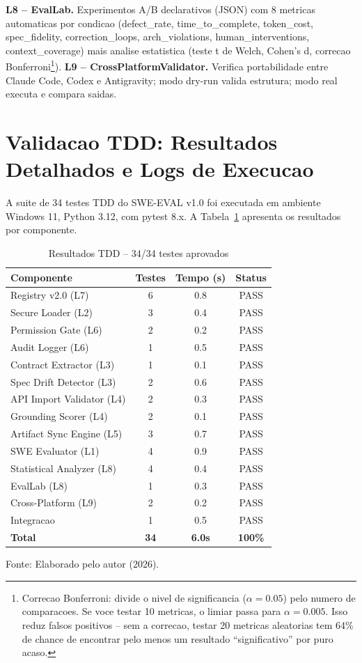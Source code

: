 \documentclass[12pt,a4paper,oneside,sumario=tradicional,chapter=TITLE,section=TITLE,subsection=TITLE,english,brazil]{abntex2}
\begin{document}
\textbf{L8 -- EvalLab.} Experimentos A/B declarativos (JSON) com 8 metricas automaticas por condicao (defect\_rate, time\_to\_complete, token\_cost, spec\_fidelity, correction\_loops, arch\_violations, human\_interventions, context\_coverage) mais analise estatistica (teste t de Welch, Cohen's d, correcao Bonferroni\footnote{Correcao Bonferroni: divide o nivel de significancia ($\alpha=0.05$) pelo numero de comparacoes. Se voce testar 10 metricas, o limiar passa para $\alpha=0.005$. Isso reduz falsos positivos -- sem a correcao, testar 20 metricas aleatorias tem 64\% de chance de encontrar pelo menos um resultado ``significativo'' por puro acaso.}). \textbf{L9 -- CrossPlatformValidator.} Verifica portabilidade entre Claude Code, Codex e Antigravity; modo dry-run valida estrutura; modo real executa e compara saidas.

\section{Validacao TDD: Resultados Detalhados e Logs de Execucao}

A suite de 34 testes TDD do SWE-EVAL v1.0 foi executada em ambiente Windows 11, Python 3.12, com pytest 8.x. A Tabela~\ref{tab:tdd} apresenta os resultados por componente.

\begin{table}[H]\centering\caption{Resultados TDD -- 34/34 testes aprovados}\label{tab:tdd}
\begin{tabular}{lccc}\toprule\textbf{Componente} & \textbf{Testes} & \textbf{Tempo (s)} & \textbf{Status} \\\midrule
Registry v2.0 (L7) & 6 & 0.8 & PASS \\
Secure Loader (L2) & 3 & 0.4 & PASS \\
Permission Gate (L6) & 2 & 0.2 & PASS \\
Audit Logger (L6) & 1 & 0.5 & PASS \\
Contract Extractor (L3) & 1 & 0.1 & PASS \\
Spec Drift Detector (L3) & 2 & 0.6 & PASS \\
API Import Validator (L4) & 2 & 0.3 & PASS \\
Grounding Scorer (L4) & 2 & 0.1 & PASS \\
Artifact Sync Engine (L5) & 3 & 0.7 & PASS \\
SWE Evaluator (L1) & 4 & 0.9 & PASS \\
Statistical Analyzer (L8) & 4 & 0.4 & PASS \\
EvalLab (L8) & 1 & 0.3 & PASS \\
Cross-Platform (L9) & 2 & 0.2 & PASS \\
Integracao & 1 & 0.5 & PASS \\\midrule
\textbf{Total} & \textbf{34} & \textbf{6.0s} & \textbf{100\%} \\\bottomrule
\end{tabular}
\small\vspace{2pt}Fonte: Elaborado pelo autor (2026).\smallskip
\end{table}
\end{document}
